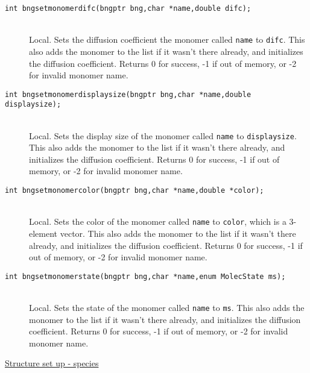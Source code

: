 \documentclass {book}
\begin{document}
\begin{description}
\item[\texttt{int bngsetmonomerdifc(bngptr bng,char *name,double difc);}]
\hfill \\
Local.  Sets the diffusion coefficient the monomer called \texttt{name} to \texttt{difc}.  This also adds the monomer to the list if it wasn't there already, and initializes the diffusion coefficient.  Returns 0 for success, -1 if out of memory, or -2 for invalid monomer name.

\item[\texttt{int bngsetmonomerdisplaysize(bngptr bng,char *name,double displaysize);}]
\hfill \\
Local.  Sets the display size of the monomer called \texttt{name} to \texttt{displaysize}.  This also adds the monomer to the list if it wasn't there already, and initializes the diffusion coefficient.  Returns 0 for success, -1 if out of memory, or -2 for invalid monomer name.

\item[\texttt{int bngsetmonomercolor(bngptr bng,char *name,double *color);}]
\hfill \\
Local.  Sets the color of the monomer called \texttt{name} to \texttt{color}, which is a 3-element vector.  This also adds the monomer to the list if it wasn't there already, and initializes the diffusion coefficient.  Returns 0 for success, -1 if out of memory, or -2 for invalid monomer name.

\item[\texttt{int bngsetmonomerstate(bngptr bng,char *name,enum MolecState ms);}]
\hfill \\
Local.  Sets the state of the monomer called \texttt{name} to \texttt{ms}.  This also adds the monomer to the list if it wasn't there already, and initializes the diffusion coefficient.  Returns 0 for success, -1 if out of memory, or -2 for invalid monomer name.

\item[\underline{Structure set up - species}]


\end{description}
\end{document}
